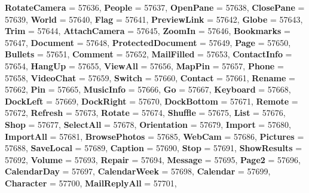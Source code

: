 \begin{DoxyCompactItemize}
{\bfseries Rotate\+Camera} = 57636, 
{\bfseries People} = 57637, 
\newline
{\bfseries Open\+Pane} = 57638, 
{\bfseries Close\+Pane} = 57639, 
{\bfseries World} = 57640, 
{\bfseries Flag} = 57641, 
\newline
{\bfseries Preview\+Link} = 57642, 
{\bfseries Globe} = 57643, 
{\bfseries Trim} = 57644, 
{\bfseries Attach\+Camera} = 57645, 
\newline
{\bfseries Zoom\+In} = 57646, 
{\bfseries Bookmarks} = 57647, 
{\bfseries Document} = 57648, 
{\bfseries Protected\+Document} = 57649, 
\newline
{\bfseries Page} = 57650, 
{\bfseries Bullets} = 57651, 
{\bfseries Comment} = 57652, 
{\bfseries Mail\+Filled} = 57653, 
\newline
{\bfseries Contact\+Info} = 57654, 
{\bfseries Hang\+Up} = 57655, 
{\bfseries View\+All} = 57656, 
{\bfseries Map\+Pin} = 57657, 
\newline
{\bfseries Phone} = 57658, 
{\bfseries Video\+Chat} = 57659, 
{\bfseries Switch} = 57660, 
{\bfseries Contact} = 57661, 
\newline
{\bfseries Rename} = 57662, 
{\bfseries Pin} = 57665, 
{\bfseries Music\+Info} = 57666, 
{\bfseries Go} = 57667, 
\newline
{\bfseries Keyboard} = 57668, 
{\bfseries Dock\+Left} = 57669, 
{\bfseries Dock\+Right} = 57670, 
{\bfseries Dock\+Bottom} = 57671, 
\newline
{\bfseries Remote} = 57672, 
{\bfseries Refresh} = 57673, 
{\bfseries Rotate} = 57674, 
{\bfseries Shuffle} = 57675, 
\newline
{\bfseries List} = 57676, 
{\bfseries Shop} = 57677, 
{\bfseries Select\+All} = 57678, 
{\bfseries Orientation} = 57679, 
\newline
{\bfseries Import} = 57680, 
{\bfseries Import\+All} = 57681, 
{\bfseries Browse\+Photos} = 57685, 
{\bfseries Web\+Cam} = 57686, 
\newline
{\bfseries Pictures} = 57688, 
{\bfseries Save\+Local} = 57689, 
{\bfseries Caption} = 57690, 
{\bfseries Stop} = 57691, 
\newline
{\bfseries Show\+Results} = 57692, 
{\bfseries Volume} = 57693, 
{\bfseries Repair} = 57694, 
{\bfseries Message} = 57695, 
\newline
{\bfseries Page2} = 57696, 
{\bfseries Calendar\+Day} = 57697, 
{\bfseries Calendar\+Week} = 57698, 
{\bfseries Calendar} = 57699, 
\newline
{\bfseries Character} = 57700, 
{\bfseries Mail\+Reply\+All} = 57701, 

\end{DoxyCompactItemize}
